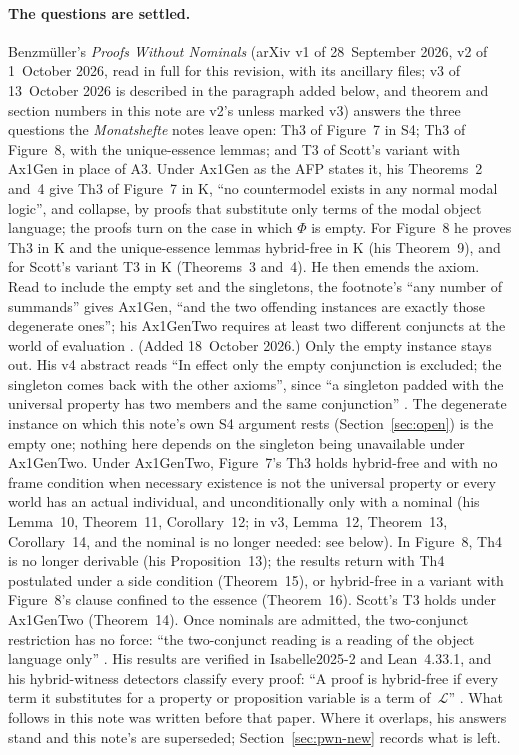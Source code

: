 \documentclass[11pt,a4paper]{article}
\theoremstyle{definition}
\theoremstyle{remark}
\begin{document}
\paragraph{The questions are settled.}
Benzm\"uller's \emph{Proofs Without Nominals} \cite{benzmuellerPWN2026}
(arXiv v1 of 28~September 2026, v2 of 1~October 2026, read in full for this
revision, with its ancillary files; v3 of 13~October 2026 is described in the
paragraph added below, and theorem and section numbers in this note are v2's
unless marked v3) answers the three questions the
\emph{Monatshefte} notes leave open: Th3 of Figure~7 in S4; Th3 of Figure~8,
with the unique-essence lemmas; and T3 of Scott's variant with Ax1Gen in
place of A3.
Under Ax1Gen as the AFP states it, his Theorems~2 and~4 give Th3 of
Figure~7 in K, ``no countermodel exists in any normal modal logic'', and
collapse, by proofs that substitute only terms of the modal object language;
the proofs turn on the case in which \(\Phi\) is empty.
For Figure~8 he proves Th3 in K and the unique-essence lemmas hybrid-free in
K (his Theorem~9), and for Scott's variant T3 in K (Theorems~3 and~4).
He then emends the axiom.
Read to include the empty set and the singletons, the footnote's ``any number
of summands'' gives Ax1Gen, ``and the two offending instances are exactly
those degenerate ones''; his Ax1GenTwo requires at least two different
conjuncts at the world of evaluation \cite[Sect.~6]{benzmuellerPWN2026}.
(Added 18~October 2026.)
Only the empty instance stays out.
His v4 abstract reads ``In effect only the empty conjunction is excluded;
the singleton comes back with the other axioms'', since ``a singleton padded
with the universal property has two members and the same conjunction''
\cite[v4, abstract and Sect.~1]{benzmuellerPWN2026}.
The degenerate instance on which this note's own S4 argument rests
(Section~\ref{sec:open}) is the empty one; nothing here depends on the
singleton being unavailable under Ax1GenTwo.
Under Ax1GenTwo, Figure~7's Th3 holds hybrid-free and with no frame
condition when necessary existence is not the universal property or every
world has an actual individual, and unconditionally only with a nominal (his
Lemma~10, Theorem~11, Corollary~12; in v3, Lemma~12, Theorem~13,
Corollary~14, and the nominal is no longer needed: see below).
In Figure~8, Th4 is no longer derivable (his Proposition~13); the results
return with Th4 postulated under a side condition (Theorem~15), or
hybrid-free in a variant with Figure~8's clause confined to the essence
(Theorem~16).
Scott's T3 holds under Ax1GenTwo (Theorem~14).
Once nominals are admitted, the two-conjunct restriction has no force: ``the
two-conjunct reading is a reading of the object language only''
\cite[Sect.~6.2]{benzmuellerPWN2026}.
His results are verified in Isabelle2025-2 and Lean~4.33.1, and his
hybrid-witness detectors classify every proof: ``A proof is hybrid-free if
every term it substitutes for a property or proposition variable is a term
of~\(\mathcal{L}\)'' \cite[Sect.~3]{benzmuellerPWN2026}.
What follows in this note was written before that paper.
Where it overlaps, his answers stand and this note's are superseded;
Section~\ref{sec:pwn-new} records what is left.
\end{document}

